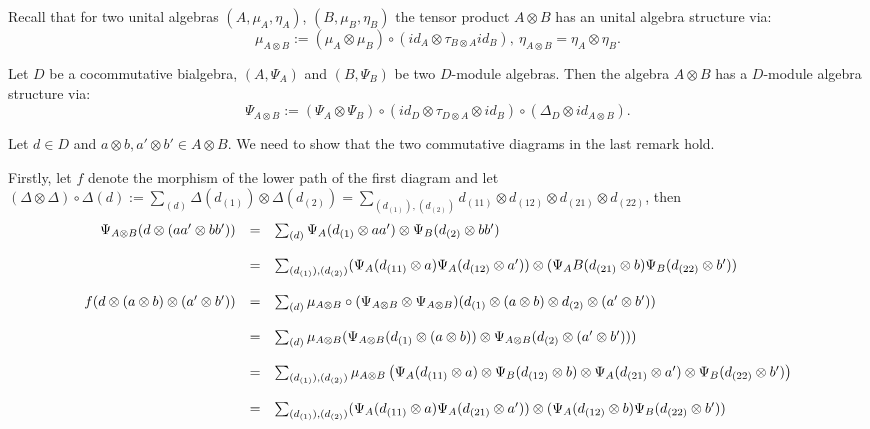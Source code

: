 Recall that for two unital algebras $(A,\mu_A,\eta_A)$, $(B,\mu_B,\eta_B)$ the tensor product $A \otimes B$ has an unital algebra structure via:
$$\mu_{A\otimes B} := (\mu_A \otimes \mu_{B}) \circ (id_A \otimes \tau_{B \otimes A} id_B),\ \eta_{A \otimes B} = \eta_A \otimes \eta_B.$$
\begin{lemm}\label{d_mod_tens_prod}
Let $D$ be a cocommutative bialgebra, $(A,\Psi_A)$ and $(B,\Psi_B)$ be two $D$-module algebras. Then the algebra $A \otimes B$ has a $D$-module algebra structure via:
$$\Psi_{A\otimes B} := \left(\Psi_A \otimes \Psi_B\right) \circ (id_D \otimes \tau_{D \otimes A} \otimes id_B) \circ (\Delta_D \otimes id_{A \otimes B}).$$
\end{lemm}
\bws Let $d \in D$ and $a \otimes b, a'\otimes b' \in A\otimes B$. We need to show that the two commutative diagrams in the last remark hold.
\bn
\item Firstly, let $f$ denote the morphism of the lower path of the first diagram and let $(\Delta \otimes \Delta) \circ \Delta(d) := \sum_{(d)} \Delta(d_{(1)}) \otimes \Delta(d_{(2)}) = \sum_{(d_{(1)}),(d_{(2)})} d_{(11)} \otimes d_{(12)} \otimes d_{(21)} \otimes d_{(22)}$, then
{\scriptsize
$$\bao{rcl}
\Psi_{A\otimes B}(d \otimes (a a' \otimes b b')) &=& \sum_{(d)} \Psi_A(d_{(1)} \otimes a a') \otimes \Psi_B(d_{(2)} \otimes b b')\\
&&\\
&=& \sum_{(d_{(1)}),(d_{(2)})} (\Psi_A(d_{(11)} \otimes a)\Psi_A(d_{(12)}\otimes a')) \otimes (\Psi_AB(d_{(21)} \otimes b)\Psi_B(d_{(22)} \otimes b'))\\
&&\\
f(d \otimes (a \otimes b) \otimes (a'\otimes b')) &=& \sum_{(d)}\mu_{A\otimes B} \circ (\Psi_{A\otimes B} \otimes \Psi_{A\otimes B})(d_{(1)} \otimes (a \otimes b) \otimes d_{(2)} \otimes (a' \otimes b'))\\
&&\\
&=& \sum_{(d)} \mu_{A\otimes B} (\Psi_{A\otimes B}(d_{(1)} \otimes (a \otimes b)) \otimes \Psi_{A\otimes B}(d_{(2)} \otimes (a' \otimes b')))\\
&&\\
&=& \sum_{(d_{(1)}),(d_{(2)})} \mu_{A\otimes B}\left(\Psi_A(d_{(11)} \otimes a) \otimes \Psi_B(d_{(12)} \otimes b) \otimes \Psi_A(d_{(21)} \otimes a') \otimes \Psi_B(d_{(22)} \otimes b')\right)\\
&&\\
&=& \sum_{(d_{(1)}),(d_{(2)})} (\Psi_A(d_{(11)} \otimes a)\Psi_A(d_{(21)}\otimes a')) \otimes (\Psi_A(d_{(12)} \otimes b)\Psi_B(d_{(22)} \otimes b'))\\
\ea$$}
